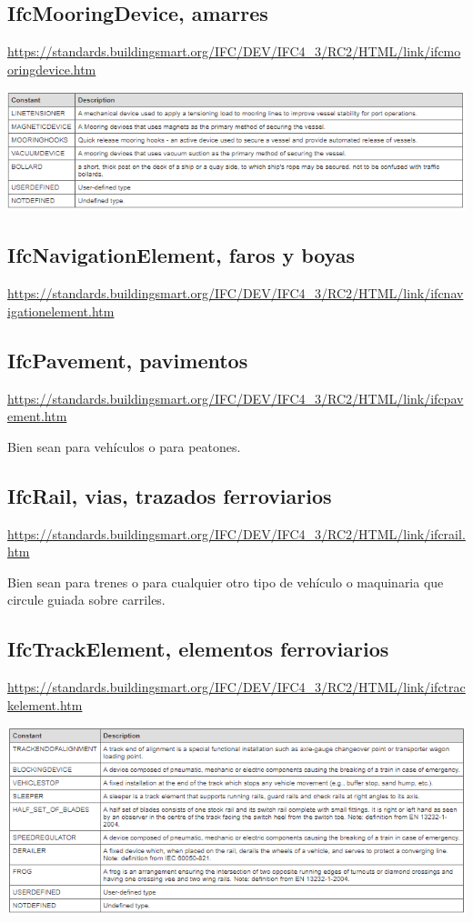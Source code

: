 \documentclass[spanish,12pt,a4paper,final,oneside]{book}
\begin{document}
\subsection{IfcMooringDevice, amarres}
\url{https://standards.buildingsmart.org/IFC/DEV/IFC4_3/RC2/HTML/link/ifcmooringdevice.htm}

\includegraphics[width=\textwidth]{Definicion de IfcMooringDeviceTypeEnum}


\subsection{IfcNavigationElement, faros y boyas}
\url{https://standards.buildingsmart.org/IFC/DEV/IFC4_3/RC2/HTML/link/ifcnavigationelement.htm}

\subsection{IfcPavement, pavimentos}
\url{https://standards.buildingsmart.org/IFC/DEV/IFC4_3/RC2/HTML/link/ifcpavement.htm}

Bien sean para vehículos o para peatones.

\subsection{IfcRail, vias, trazados ferroviarios}
\url{https://standards.buildingsmart.org/IFC/DEV/IFC4_3/RC2/HTML/link/ifcrail.htm}

Bien sean para trenes o para cualquier otro tipo de vehículo o maquinaria que circule guiada sobre carriles.

\subsection{IfcTrackElement, elementos ferroviarios}
\url{https://standards.buildingsmart.org/IFC/DEV/IFC4_3/RC2/HTML/link/ifctrackelement.htm}

\includegraphics[width=\textwidth]{Definicion de IfcTrackElementTypeEnum}
\end{document}
